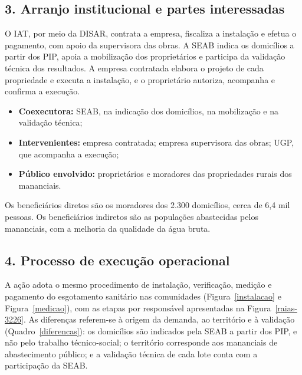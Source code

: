 

{}
\subsection*{3. Arranjo institucional e partes interessadas}

O IAT, por meio da DISAR, contrata a empresa, fiscaliza a instalação e efetua o pagamento, com apoio da supervisora das obras. A SEAB indica os domicílios a partir dos PIP, apoia a mobilização dos proprietários e participa da validação técnica dos resultados. A empresa contratada elabora o projeto de cada propriedade e executa a instalação, e o proprietário autoriza, acompanha e confirma a execução.

\begin{itemize}
  \item \textbf{Coexecutora:} SEAB, na indicação dos domicílios, na mobilização e na validação técnica;
  \item \textbf{Intervenientes:} empresa contratada; empresa supervisora das obras; UGP, que acompanha a execução;
  \item \textbf{Público envolvido:} proprietários e moradores das propriedades rurais dos mananciais.
\end{itemize}

Os beneficiários diretos são os moradores dos 2.300 domicílios, cerca de 6,4 mil pessoas. Os beneficiários indiretos são as populações abastecidas pelos mananciais, com a melhoria da qualidade da água bruta.

{}
\subsection*{4. Processo de execução operacional}

A ação adota o mesmo procedimento de instalação, verificação, medição e pagamento do esgotamento sanitário nas comunidades (Figura~\ref{instalacao} e Figura~\ref{medicao}), com as etapas por responsável apresentadas na Figura~\ref{raias-3226}. As diferenças referem-se à origem da demanda, ao território e à validação (Quadro~\ref{diferencas}): os domicílios são indicados pela SEAB a partir dos PIP, e não pelo trabalho técnico-social; o território corresponde aos mananciais de abastecimento público; e a validação técnica de cada lote conta com a participação da SEAB.


